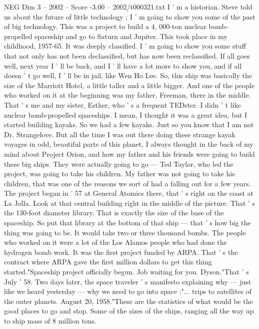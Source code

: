 \begin{textsample}{NEG Dim 3 – 2002 – Score -3.00 – 2002/t000321.txt}  \label{ex:f3_neg_006}
I ' m a historian.
Steve told us about the future of little technology ; I ' m going to show you some of the past of big technology.
This was a project to build a 4, 000-ton nuclear bomb-propelled spaceship and go to Saturn and Jupiter.
This took place in my childhood, 1957-65.
It was deeply classified.
I ' m going to show you some stuff that not only has not been declassified, but has now been reclassified.
If all goes well, next year I ' ll be back, and I ' ll have a lot more to show you, and if all doesn ' t go well, I ' ll be in jail, like Wen Ho Lee.
So, this ship was basically the size of the Marriott Hotel, a little taller and a little bigger.
And one of the people who worked on it at the beginning was my father, Freeman, there in the middle.
That ' s me and my sister, Esther, who ' s a frequent TEDster.
I didn ' t like nuclear bomb-propelled spaceships.
I mean, I thought it was a great idea, but I started building kayaks.
So we had a few kayaks.
Just so you know that I am not Dr.
Strangelove.
But all the time I was out there doing these strange kayak voyages in odd, beautiful parts of this planet, I always thought in the back of my mind about Project Orion, and how my father and his friends were going to build these big ships.
They were actually going to go — Ted Taylor, who led the project, was going to take his children.
My father was not going to take his children, that was one of the reasons we sort of had a falling out for a few years.
The project began in ' 57 at General Atomics there, that ' s right on the coast at La Jolla.
Look at that central building right in the middle of the picture.
That ' s the 130-foot diameter library.
That is exactly the size of the base of the spaceship.
So put that library at the bottom of that ship — that ' s how big the thing was going to be.
It would take two or three thousand bombs.
The people who worked on it were a lot of the Los Alamos people who had done the hydrogen bomb work.
It was the first project funded by ARPA.
That ' s the contract where ARPA gave the first million dollars to get this thing started."Spaceship project officially begun.
Job waiting for you.
Dyson."That ' s July ' 58.
Two days later, the space traveler ' s manifesto explaining why — just like we heard yesterday — why we need to go into space :"... trips to satellites of the outer planets.
August 20, 1958."These are the statistics of what would be the good places to go and stop.
Some of the sizes of the ships, ranging all the way up to ship mass of 8 million tons.

\end{textsample}
